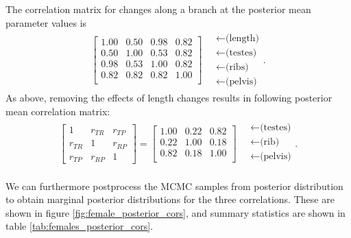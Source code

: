 \documentclass[12pt]{article}
\begin{document}
The correlation matrix for changes along a branch at the posterior mean parameter values is 
\begin{align}
\begin{bmatrix}
  1.00 & 0.50 & 0.98 & 0.82 \\ 
  0.50 & 1.00 & 0.53 & 0.82 \\ 
  0.98 & 0.53 & 1.00 & 0.82 \\ 
  0.82 & 0.82 & 0.82 & 1.00 \\ 
\end{bmatrix}
\quad \begin{matrix}
  \leftarrow \text{(length)} \\
  \leftarrow \text{(testes)} \\
  \leftarrow \text{(ribs)} \\
  \leftarrow \text{(pelvis)} 
\end{matrix} .
\end{align}
As above, removing the effects of length changes results in following posterior mean correlation matrix:
\begin{align}
\begin{bmatrix}
  1 & r_{TR} & r_{TP} \\ 
  r_{TR} & 1 & r_{RP} \\ 
  r_{TP} & r_{RP} & 1 
 \end{bmatrix}
 =
\begin{bmatrix}
   1.00 & 0.22 & 0.82 \\ 
   0.22 & 1.00 & 0.18 \\ 
   0.82 & 0.18 & 1.00 \\ 
 \end{bmatrix}
\quad \begin{matrix}
  \leftarrow \text{(testes)} \\
  \leftarrow \text{(rib)} \\
  \leftarrow \text{(pelvis)} \\
\end{matrix}  .
\end{align}

We can furthermore postprocess the MCMC samples from posterior distribution
to obtain marginal posterior distributions for the three correlations.
These are shown in figure \ref{fig:female_posterior_cors},
and summary statistics are shown in table \ref{tab:females_posterior_cors}.
\end{document}
